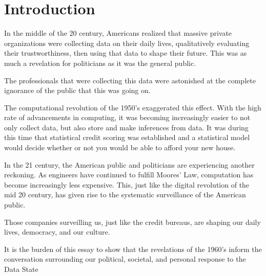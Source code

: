 \section{Introduction}

In the middle of the 20 century, Americans realized that massive private
organizations were collecting data on their daily lives, qualitatively
evaluating their trustworthiness, then using that data to shape their future.
This was as much a revelation for politicians as it was the general public.

The professionals that were collecting this data were astonished at the complete
ignorance of the public that this was going on.

The computational revolution of the 1950's exaggerated this effect. With the
high rate of advancements in computing, it was becoming increasingly easier to
not only collect data, but also store and make inferences from data. It was
during this time that statistical credit scoring was established and a
statistical model would decide whether or not you would be able to afford your
new house.

In the 21 century, the American public and politicians are experiencing
another reckoning. As engineers have continued to fulfill Moores' Law,
computation has become increasingly less expensive. This, just like the digital
revolution of the mid 20 century, has given rise to the systematic
surveillance of the American public.

Those companies surveilling us, just like the credit bureaus, are shaping our
daily lives, democracy, and our culture.

It is the burden of this essay to show that the revelations of the 1960's
inform the conversation surrounding our political, societal, and personal
response to the Data State %



